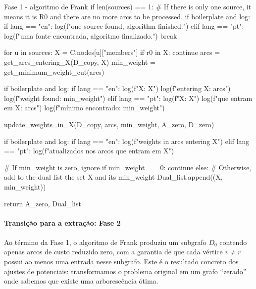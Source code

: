 \documentclass[12pt,a4paper]{article}
\begin{document}
\begin{pybox}{Fase 1 - algoritmo de Frank}
        if len(sources) == 1:
            # If there is only one source, it means it is R0 and there are no more arcs to be processed.
            if boilerplate and log:
                if lang == "en":
                    log(f"\nOnly one source found, algorithm finished.")
                elif lang == "pt":
                    log(f"\nApenas uma fonte encontrada, algoritmo finalizado.")
            break

        for u in sources:
            X = C.nodes[u]["members"]
            if r0 in X:
                continue
            arcs = get_arcs_entering_X(D_copy, X)
            min_weight = get_minimum_weight_cut(arcs)

            if boilerplate and log:
                if lang == "en":
                    log(f"\nSet X: {X}")
                    log(f"\nArcs entering X: {arcs}")
                    log(f"\nMinimum weight found: {min_weight}")
                elif lang == "pt":
                    log(f"\nConjunto X: {X}")
                    log(f"\nArestas que entram em X: {arcs}")
                    log(f"\nPeso mínimo encontrado: {min_weight}")

            update_weights_in_X(D_copy, arcs, min_weight, A_zero, D_zero)

            if boilerplate and log:
                if lang == "en":
                    log(f"\nUpdated weights in arcs entering X")
                elif lang == "pt":
                    log(f"\nPesos atualizados nos arcos que entram em X")

            # If min_weight is zero, ignore
            if min_weight == 0:
                continue
            else:
                # Otherwise, add to the dual list the set X and its min_weight
                Dual_list.append((X, min_weight))

    return A_zero, Dual_list
\end{pybox}

\paragraph{Transição para a extração: Fase 2}
\paragraph{}
Ao término da Fase 1, o algoritmo de Frank produziu um subgrafo \(D_0\) contendo apenas arcos de custo reduzido zero, com a garantia de que cada vértice \(v\neq r\) possui ao menos uma entrada nesse subgrafo. Este é o resultado concreto dos ajustes de potenciais: transformamos o problema original em um grafo ``zerado'' onde sabemos que existe uma arborescência ótima.
\end{document}
